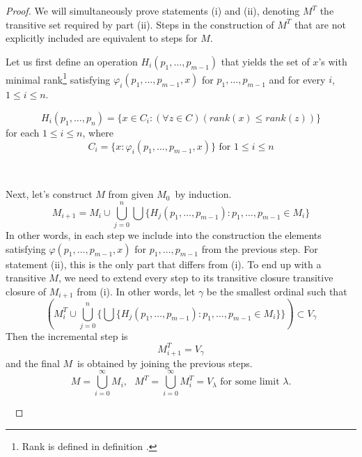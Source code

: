 \begin{proof}
We will simultaneously prove statements (i) and (ii), denoting $M^T$ the transitive set required by part (ii).
Steps in the construction of $M^T$ that are not explicitly included are equivalent to steps for $M$.

Let us first define an operation $H_i(p_1, \ldots, p_{m-1})$ that yields the set of $x$'s with minimal rank\footnote{Rank is defined in definition .} satisfying $\varphi_i(p_1, \ldots, p_{m-1}, x)$ for $p_1, \ldots, p_{m-1}$ and for every $i$, $1 \leq i \leq n$.

\begin{equation}
H_i(p_1, \ldots, p_n) = \{x \in C_i: (\forall z \in C)(rank(x) \leq rank(z))\}
\end{equation}
for each $1 \leq i \leq n$, where
\begin{equation}
C_i = \{x: \varphi_i(p_1, \ldots, p_{m-1}, x)\} \mbox{ for $1 \leq i \leq n$}
\end{equation}

\

Next, let's construct $M$ from given $M_0$ by induction. 
\begin{equation}
M_{i+1} = M_i \cup \bigcup_{j=0}^{n} \bigcup \{H_j(p_1, \ldots, p_{m-1}): p_1, \ldots, p_{m-1} \in M_i\}
\end{equation}
In other words, in each step we include into the construction the elements satisfying $\varphi(p_1, \ldots, p_{m-1}, x)$ for $p_1, \ldots, p_{m-1}$ from the previous step.
For statement (ii), this is the only part that differs from (i). To end up with a transitive $M$, we need to extend every step to its transitive closure transitive closure of $M_{i+1}$ from (i). In other words, let $\gamma$ be the smallest ordinal such that 
\begin{equation}
(M^T_i \cup \bigcup_{j=0}^{n} \{\bigcup\{H_j(p_1, \ldots, p_{m-1}): p_1, \ldots, p_{m-1} \in M_i\}\}) \subset V_\gamma
\end{equation}
Then the incremental step is
\begin{equation}
M^T_{i+1} = V_\gamma
\end{equation}
and the final $M$ is obtained by joining the previous steps.
\begin{equation}
M = \bigcup_{i=0}^{\infty} M_i, \mbox{  }M^T = \bigcup_{i=0}^{\infty} M^T_i = V_\lambda\mbox{ for some limit }\lambda\mbox{.}
\end{equation}

\


\end{proof}
